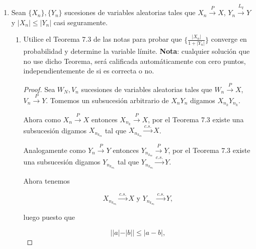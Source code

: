 \documentclass[letterpaper]{article}
\theoremstyle{definition}
\theoremstyle{lemathm}
\theoremstyle{lemademthm}
\newcommand{\limninf}{\lim_{n\to\infty}}
\newcommand{\bracs}[1]{\left[ #1 \right] }
\newcommand{\1}{\mathbbm{1}}
\begin{document}
\begin{enumerate}
\begin{itemize}







		\end{itemize}

		\newpage

		\item Sean $\{X_n\},\{Y_n\}$ sucesiones de variables aleatorias tales que $X_n\overset{P}{\to} X$, $Y_n\overset{L_q}{\to} Y$ y $|X_n|\leq |Y_n|$ casi seguramente. 
		
		\begin{enumerate}
			\item Utilice el Teorema 7.3 de las notas para probar que $\big\{\frac{|X_n|}{1+|Y_n|}\big\}$ converge en probabilidad y determine la variable límite. \textbf{Nota}: cualquier solución que no use dicho Teorema, será calificada automáticamente con cero puntos, independientemente de si es correcta o no.
			
			\begin{proof}
				Sea $W_N, V_n$ sucesiones de variables aleatorias tales que $W_n\xrightarrow{P} X$, $V_n\xrightarrow{P} Y$. Tomemos un subsucesión arbitrario de $X_nY_n$ digamos $X_{n_k}Y_{n_k}$. 
				
				Ahora como $X_n \xrightarrow{P} X$ entonces $X_{n_k} \xrightarrow{P} X$, por el Teorema 7.3 existe una subsucesión digamos $X_{n_{k_m}}$ tal que $X_{n_{k_m}} \xrightarrow{c.s.} X$.
				
				Analogamente como $Y_n \xrightarrow{P} Y$ entonces $Y_{n_{k_m}} \xrightarrow{P} Y$, por el Teorema 7.3 existe una subsucesión digamos $Y_{n_{k_{m_l}}}$ tal que $Y_{n_{k_{m_l}}} \xrightarrow{c.s.} Y$.

				Ahora tenemos

				\[X_{n_{k_{m_l}}} \xrightarrow{c.s.} X \text{ y } Y_{n_{k_{m_l}}} \xrightarrow{c.s.} Y,\]

				luego puesto que

				\[||a|-|b|| \leq |a - b|,\]


\end{proof}
\end{enumerate}
\end{enumerate}
\end{document}
